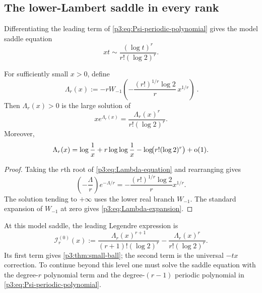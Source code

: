 \documentclass[11pt,oneside]{article}
\theoremstyle{definition}
\theoremstyle{remark}
\begin{document}
\subsection{The lower-Lambert saddle in every rank}

Differentiating the leading term of \eqref{p3:eq:Psi-periodic-polynomial} gives the model saddle equation
\begin{equation}\label{p3:eq:model-saddle}
  xt\sim\frac{(\log t)^r}{r!(\log2)^r}.
\end{equation}

\begin{proposition}\label{p3:prop:Lambert-coordinate}
For sufficiently small $x>0$, define
\begin{equation}\label{p3:eq:Lambda-r}
 \boxed{\ 
 \Lambda_r(x):=-rW_{-1}\!\left(
 -\frac{(r!)^{1/r}\log2}{r}\,x^{1/r}
 \right)
 \ }.
\end{equation}
Then $\Lambda_r(x)>0$ is the large solution of
\begin{equation}\label{p3:eq:Lambda-equation}
  xe^{\Lambda_r(x)}
  =\frac{\Lambda_r(x)^r}{r!(\log2)^r}.
\end{equation}
Moreover,
\begin{equation}\label{p3:eq:Lambda-expansion}
 \Lambda_r(x)=\log\frac1x+r\log\log\frac1x
 -\log\!\bigl(r!(\log2)^r\bigr)+\mathrm o(1).
\end{equation}
\end{proposition}

\begin{proof}
Taking the $r$th root of \eqref{p3:eq:Lambda-equation} and rearranging gives
\[
 \left(-\frac{\Lambda}{r}\right)e^{-\Lambda/r}
 =-\frac{(r!)^{1/r}\log2}{r}x^{1/r}.
\]
The solution tending to $+\infty$ uses the lower real branch $W_{-1}$.  The standard expansion of $W_{-1}$ at zero \cite{p3:corless-lambert,p3:dlmf-lambert} gives \eqref{p3:eq:Lambda-expansion}.
\end{proof}

At this model saddle, the leading Legendre expression is
\begin{equation}\label{p3:eq:model-rate}
 \mathscr I_r^{(0)}(x)
 :=\frac{\Lambda_r(x)^{r+1}}{(r+1)!(\log2)^r}
 -\frac{\Lambda_r(x)^r}{r!(\log2)^r}.
\end{equation}
Its first term gives \cref{p3:thm:small-ball}; the second term is the universal $-tx$ correction.  To continue beyond this level one must solve the saddle equation with the degree-$r$ polynomial term and the degree-$(r-1)$ periodic polynomial in \eqref{p3:eq:Psi-periodic-polynomial}.
\end{document}
